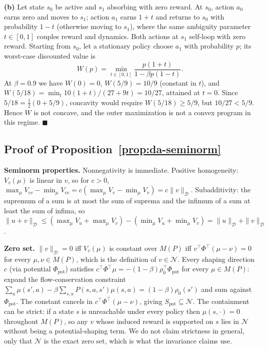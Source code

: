 \documentclass{article}
\newcommand{\Dnorm}[1]{\|#1\|_{\mathcal D}}
\begin{document}
\textbf{(b)} Let state $s_0$ be active and $s_1$ absorbing with zero reward.
At $s_0$, action $a_0$ earns zero and moves to $s_1$; action $a_1$ earns
$1+t$ and returns to $s_0$ with probability $1-t$ (otherwise moving to
$s_1$), where the same ambiguity parameter $t\in[0,1]$ couples reward and
dynamics. Both actions at $s_1$ self-loop with zero reward. Starting from
$s_0$, let a stationary policy choose $a_1$ with probability $p$; its
worst-case discounted value is
\[
W(p) = \min_{t\in[0,1]} \frac{p(1+t)}{1-\beta p(1-t)}.
\]
At $\beta=0.9$ we have $W(0)=0$, $W(5/9)=10/9$ (constant in $t$), and
$W(5/18)=\min_{t}10(1+t)/(27+9t)=10/27$, attained at $t=0$. Since
$5/18=\tfrac12(0+5/9)$, concavity would require $W(5/18)\ge 5/9$, but
$10/27<5/9$. Hence $W$ is not concave, and the outer maximization is not a
convex program in this regime. $\blacksquare$

\subsection{Proof of Proposition~\ref{prop:da-seminorm}}
\label{app:proof-da-seminorm}

\textbf{Seminorm properties.} Nonnegativity is immediate. Positive homogeneity:
$V_v(\mu)$ is linear in $v$, so for $c>0$, $\max_\mu V_{cv}-\min_\mu
V_{cv}=c(\max_\mu V_v-\min_\mu V_v)=c\Dnorm{v}$. Subadditivity: the supremum of
a sum is at most the sum of suprema and the infimum of a sum at least the sum
of infima, so
$\Dnorm{u+v}\le(\max_\mu V_u+\max_\mu V_v)-(\min_\mu V_u+\min_\mu
V_v)=\Dnorm{u}+\Dnorm{v}$.

\textbf{Zero set.} $\Dnorm{v}=0$ iff $V_v(\mu)$ is constant over $M(P)$ iff
$v^\top\Phi^\top(\mu-\nu)=0$ for every $\mu,\nu\in M(P)$, which is the
definition of $v\in\mathcal N$. Every shaping direction $c$ (via potential
$\Phi_{\mathrm{pot}}$) satisfies
$c^\top\Phi^\top\mu=-(1-\beta)\rho_0^\top\Phi_{\mathrm{pot}}$ for every
$\mu\in M(P)$: expand the flow-conservation constraint
$\sum_a\mu(s',a)-\beta\sum_{s,a}P(s,a,s')\mu(s,a)=(1-\beta)\rho_0(s')$ and sum
against $\Phi_{\mathrm{pot}}$. The constant cancels in
$c^\top\Phi^\top(\mu-\nu)$, giving $S_{\mathrm{pot}}\subseteq\mathcal N$. The
containment can be strict: if a state $s$ is unreachable under every policy then
$\mu(s,\cdot)=0$ throughout $M(P)$, so any $v$ whose induced reward is supported
on $s$ lies in $\mathcal N$ without being a potential-shaping term. We do not
claim strictness in general, only that $\mathcal N$ is the exact zero set, which
is what the invariance claims use.
\end{document}
